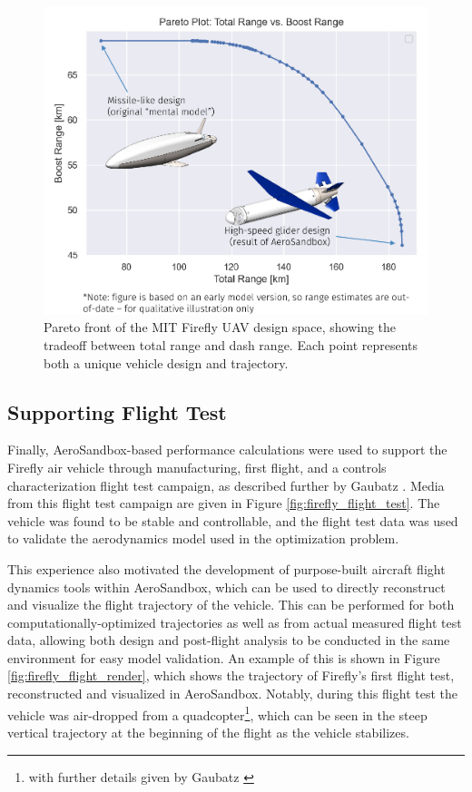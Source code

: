 \begin{figure}[H]
    \centering
    \includegraphics[width=\textwidth]{../figures/firefly_pareto-crop.pdf}
    \caption{Pareto front of the MIT Firefly UAV design space, showing the tradeoff between total range and dash range. Each point represents both a unique vehicle design and trajectory.}
    \label{fig:firefly_pareto}
\end{figure}

\subsection{Supporting Flight Test}

Finally, AeroSandbox-based performance calculations were used to support the Firefly air vehicle through manufacturing, first flight, and a controls characterization flight test campaign, as described further by Gaubatz \cite{gaubatz_design_2024}. Media from this flight test campaign are given in Figure \ref{fig:firefly_flight_test}. The vehicle was found to be stable and controllable, and the flight test data was used to validate the aerodynamics model used in the optimization problem.

This experience also motivated the development of purpose-built aircraft flight dynamics tools within AeroSandbox, which can be used to directly reconstruct and visualize the flight trajectory of the vehicle. This can be performed for both computationally-optimized trajectories as well as from actual measured flight test data, allowing both design and post-flight analysis to be conducted in the same environment for easy model validation. An example of this is shown in Figure \ref{fig:firefly_flight_render}, which shows the trajectory of Firefly's first flight test, reconstructed and visualized in AeroSandbox. Notably, during this flight test the vehicle was air-dropped from a quadcopter\footnote{with further details given by Gaubatz \cite{gaubatz_design_2024}}, which can be seen in the steep vertical trajectory at the beginning of the flight as the vehicle stabilizes.

